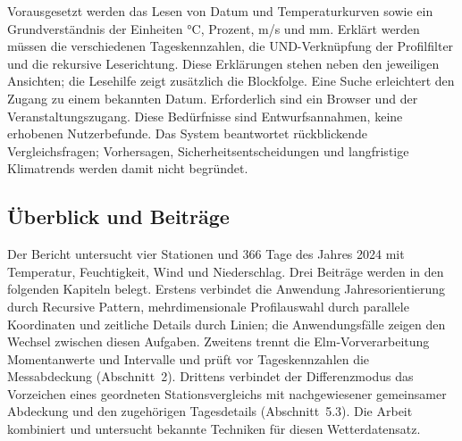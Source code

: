 \documentclass[usegeometry=true]{scrartcl}
\begin{document}
Vorausgesetzt werden das Lesen von Datum und Temperaturkurven sowie
ein Grundverständnis der Einheiten °C, Prozent, m/s und mm. Erklärt werden
müssen die verschiedenen Tageskennzahlen, die UND-Verknüpfung der
Profilfilter und die rekursive Leserichtung. Diese Erklärungen stehen
neben den jeweiligen Ansichten; die Lesehilfe zeigt zusätzlich die
Blockfolge. Eine Suche erleichtert den Zugang zu einem bekannten Datum.
Erforderlich sind ein Browser und der Veranstaltungszugang.
Diese Bedürfnisse sind Entwurfsannahmen, keine erhobenen Nutzerbefunde.
Das System beantwortet rückblickende Vergleichsfragen; Vorhersagen,
Sicherheitsentscheidungen und langfristige Klimatrends werden damit
nicht begründet.

\subsection{Überblick und Beiträge}
Der Bericht untersucht vier Stationen und 366 Tage des Jahres 2024
mit Temperatur, Feuchtigkeit, Wind und Niederschlag. Drei Beiträge
werden in den folgenden Kapiteln belegt. Erstens verbindet die Anwendung
Jahresorientierung durch Recursive Pattern, mehrdimensionale Profilauswahl
durch parallele Koordinaten und zeitliche Details durch Linien; die
Anwendungsfälle zeigen den Wechsel zwischen diesen Aufgaben.
Zweitens trennt die Elm-Vorverarbeitung Momentanwerte und Intervalle
und prüft vor Tageskennzahlen die Messabdeckung (Abschnitt~2).
Drittens verbindet der Differenzmodus das Vorzeichen eines geordneten
Stationsvergleichs mit nachgewiesener gemeinsamer Abdeckung und den
zugehörigen Tagesdetails (Abschnitt~5.3).
Die Arbeit kombiniert und untersucht bekannte Techniken für diesen
Wetterdatensatz.
\end{document}
